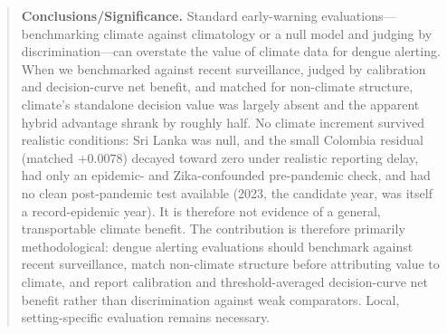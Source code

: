 \documentclass[11pt,a4paper]{article}
\begin{document}
\begin{abstract}
\noindent\textbf{Conclusions/Significance.}
Standard early-warning evaluations---benchmarking climate against climatology or a null model and judging by discrimination---can overstate the value of climate data for dengue alerting. When we benchmarked against recent surveillance, judged by calibration and decision-curve net benefit, and matched for non-climate structure, climate's standalone decision value was largely absent and the apparent hybrid advantage shrank by roughly half. No climate increment survived realistic conditions: Sri Lanka was null, and the small Colombia residual (matched $+0.0078$) decayed toward zero under realistic reporting delay, had only an epidemic- and Zika-confounded pre-pandemic check, and had no clean post-pandemic test available (2023, the candidate year, was itself a record-epidemic year). It is therefore not evidence of a general, transportable climate benefit. The contribution is therefore primarily methodological: dengue alerting evaluations should benchmark against recent surveillance, match non-climate structure before attributing value to climate, and report calibration and threshold-averaged decision-curve net benefit rather than discrimination against weak comparators. Local, setting-specific evaluation remains necessary.
\end{abstract}

\end{document}

